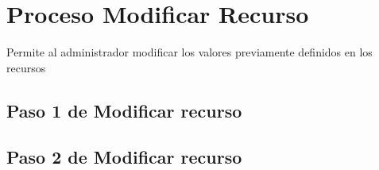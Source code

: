\chapter{Proceso Modificar Recurso}
	Permite al administrador modificar los valores previamente definidos
	en los recursos 

\section{Paso 1 de Modificar recurso}
	
	
\section{Paso 2 de Modificar recurso}
	

